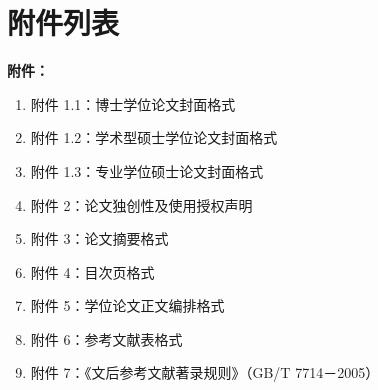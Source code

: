 \chapter[附件列表]{附件列表}

\textbf{附件：}
\begin{enumerate}[]
    \item 附件 1.1：博士学位论文封面格式
    \item 附件 1.2：学术型硕士学位论文封面格式 
    \item 附件 1.3：专业学位硕士论文封面格式 
    \item 附件 2：论文独创性及使用授权声明 
    \item 附件 3：论文摘要格式 
    \item 附件 4：目次页格式 
    \item 附件 5：学位论文正文编排格式 
    \item 附件 6：参考文献表格式 
    \item 附件 7：《文后参考文献著录规则》（GB/T 7714－2005）
\end{enumerate}


